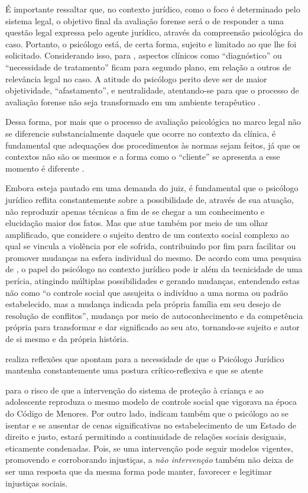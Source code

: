 É importante ressaltar que, no contexto jurídico, como o foco é determinado pelo sistema legal, o objetivo final da avaliação forense será o de responder a uma questão legal expressa pelo agente jurídico, através da compreensão psicológica do caso. Portanto, o psicólogo está, de certa forma, sujeito e limitado ao que lhe foi solicitado. Considerando isso, para , aspectos clínicos como ``diagnóstico'' ou ``necessidade de tratamento'' ficam para segundo plano, em relação a outros de relevância legal no caso. A atitude do psicólogo perito deve ser de maior objetividade, ``afastamento'', e neutralidade, atentando-se para que o processo de avaliação forense não seja transformado em um ambiente terapêutico \cite[p. 44]{ROVINSKI2004}.	

Dessa forma, por mais que o processo de avaliação psicológica no marco legal não se diferencie substancialmente daquele que ocorre no contexto da clínica, é fundamental que adequações dos procedimentos às normas sejam feitos, já que os contextos não são os mesmos e a forma como o ``cliente'' se apresenta a esse momento é diferente \cite[p. 42]{ROVINSKI2004}.

Embora esteja pautado em uma demanda do juiz, é fundamental que o psicólogo jurídico reflita constantemente sobre a possibilidade de, através de sua atuação, não reproduzir apenas técnicas a fim de se chegar a um conhecimento e elucidação maior dos fatos. Mas que atue também por meio de um olhar amplificado, que considere o sujeito dentro de um contexto social complexo ao qual se vincula a violência por ele sofrida, contribuindo por fim para facilitar ou promover mudanças na esfera individual do mesmo. De acordo com uma pesquisa de , o papel do psicólogo no contexto jurídico pode ir além da tecnicidade de uma perícia, atingindo múltiplas possibilidades e gerando mudanças, entendendo estas não como ``o controle social que assujeita o indivíduo a uma norma ou padrão estabelecido, mas a mudança indicada pela própria família em seu desejo de resolução de conflitos'', mudança por meio de autoconhecimento e da competência própria para transformar e dar significado ao seu ato, tornando-se sujeito e autor de si mesmo e da própria história. 

 realiza reflexões que apontam para a necessidade de que o Psicólogo Jurídico mantenha constantemente uma postura crítico-reflexiva e que se atente  

\begin{citacao}
	para o risco de que a intervenção do sistema de proteção à criança e ao adolescente reproduza o mesmo modelo de controle social que vigorava na época do Código de Menores. Por outro lado, indicam também que o psicólogo ao se isentar e se ausentar de cenas significativas no estabelecimento de um Estado de direito e justo, estará permitindo a continuidade de relações sociais desiguais, eticamente condenadas. Pois, se uma intervenção pode seguir modelos vigentes, promovendo e corroborando injustiças, a \emph{não intervenção} também não deixa de ser uma resposta que da mesma forma pode manter, favorecer e legitimar injustiças sociais.
\end{citacao}

